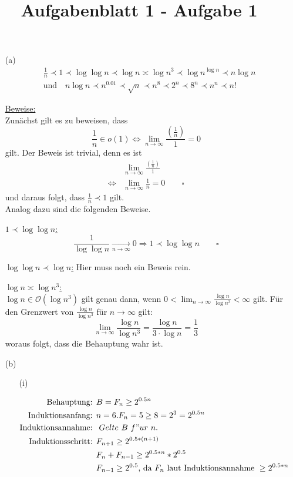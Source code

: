 \documentclass{article}
\title{Aufgabenblatt 1 - Aufgabe 1}
\begin{document}
\maketitle

\begin{enumerate}
\item[(a)]
    \begin{align*}
        &\frac{1}{n} \prec 1 \prec \log \log n \prec \log n \asymp \log n^3 \prec
        \log n^{\log n} \prec n \log n \\
        &\text{und} \quad n \log n \prec n^{0.01} \prec \sqrt{n} \prec n^8
        \prec 2^n \prec 8^n \prec n^n \prec n!
    \end{align*}


\underline{Beweise:}\\
Zunächst gilt es zu beweisen, dass
\[
    \frac{1}{n} \in o(1) \Leftrightarrow \lim_{n \to \infty}
    \frac{\left( \frac{1}{n} \right)}{1} = 0
\]
gilt. Der Beweis ist trivial, denn es ist
\begin{align*}
    &\lim_{n \to \infty} \frac{\left( \frac{1}{n} \right)}{1} \\
    \Leftrightarrow &\lim_{n \to \infty} \frac{1}{n} = 0 \quad \quad \square
\end{align*}
und daraus folgt, dass $\frac{1}{n} \prec 1$ gilt.\\
Analog dazu sind die folgenden Beweise.

\underline{$1 \prec \log \log n$:}
\[
    \frac{1}{\log \log n} \underset{n \to \infty}{\longrightarrow} 0 \Rightarrow
    1 \prec \log \log n \qquad \square
\]

\underline{$\log \log n \prec \log n$:}
Hier muss noch ein Beweis rein.

\underline{$\log n \asymp \log n^3$:}\\
$\log n \in \mathcal{O}(\log n^3)$ gilt genau dann, wenn $0 < \lim_{n \to \infty} \frac{\log
n}{\log n^3} < \infty$ gilt. Für den Grenzwert von $\frac{\log n}{\log n^3}$ für
$n \to \infty$ gilt:
\[
    \lim_{n \to \infty} \frac{\log n}{\log n^3} = \frac{\log n}{3 \cdot \log n}
    = \frac{1}{3}
\]
woraus folgt, dass die Behauptung wahr ist.


\item[(b)]

\begin{enumerate}
\item[(i)]

\begin{align*}
\text{Behauptung: }&B = F_n \ge 2^{0.5n} \\
\text{Induktionsanfang: } &n= 6. F_n = 5 \ge 8 = 2^3 = 2^{0.5n} \\
\text{Induktionsannahme: } &~Gelte~ B~ f"ur~ n. \\
\text{Induktionsschritt: } &F_{n+1} \ge 2^{0.5*(n+1)} \\
&F_n + F_{n-1} \ge 2^{0.5*n} * 2^{0.5} \\
&F_{n-1} \ge 2^{0.5} \text{, da } F_n \text{ laut Induktionsannahme } \ge 2^{0.5*n}
\end{align*}
	

\end{enumerate}
\end{enumerate}
\end{document}
